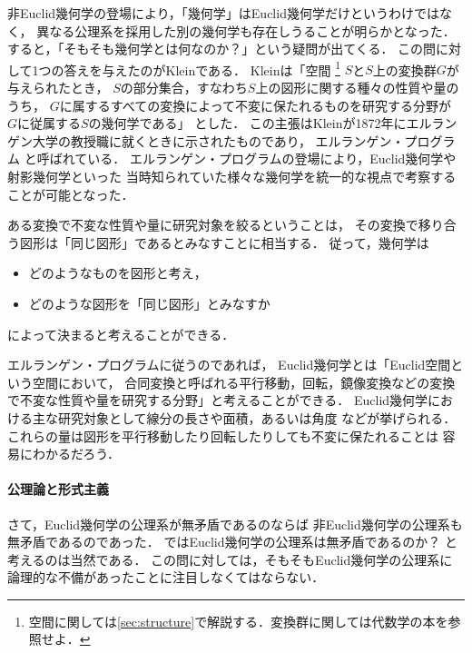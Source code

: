   非Euclid幾何学の登場により，「幾何学」はEuclid幾何学だけというわけではなく，
  異なる公理系を採用した別の幾何学も存在しうることが明らかとなった．
  すると，「そもそも幾何学とは何なのか？」という疑問が出てくる．
  この問に対して1つの答えを与えたのがKleinである．
  Kleinは「空間
  \footnote{空間に関しては\ref{sec:structure}で解説する．変換群に関しては代数学の本を参照せよ．}
  $S$と$S$上の変換群$G$が与えられたとき，
  $S$の部分集合，すなわち$S$上の図形に関する種々の性質や量のうち，
  $G$に属するすべての変換によって不変に保たれるものを研究する分野が
  $G$に従属する$S$の幾何学である」
  とした．
  この主張はKleinが1872年にエルランゲン大学の教授職に就くときに示されたものであり，
  エルランゲン・プログラム
  と呼ばれている．
  エルランゲン・プログラムの登場により，Euclid幾何学や射影幾何学といった
  当時知られていた様々な幾何学を統一的な視点で考察することが可能となった．

  ある変換で不変な性質や量に研究対象を絞るということは，
  その変換で移り合う図形は「同じ図形」であるとみなすことに相当する．
  従って，幾何学は
  \begin{itemize}
    \item どのようなものを図形と考え，
    \item どのような図形を「同じ図形」とみなすか
  \end{itemize}
  によって決まると考えることができる．

  エルランゲン・プログラムに従うのであれば，
  Euclid幾何学とは「Euclid空間という空間において，
  合同変換と呼ばれる平行移動，回転，鏡像変換などの変換
  で不変な性質や量を研究する分野」と考えることができる．
  Euclid幾何学における主な研究対象として線分の長さや面積，あるいは角度
  などが挙げられる．
  これらの量は図形を平行移動したり回転したりしても不変に保たれることは
  容易にわかるだろう．

 \paragraph{公理論と形式主義}
  さて，Euclid幾何学の公理系が無矛盾であるのならば
  非Euclid幾何学の公理系も無矛盾であるのであった．
  ではEuclid幾何学の公理系は無矛盾であるのか？ と考えるのは当然である．
  この問に対しては，そもそもEuclid幾何学の公理系に
  論理的な不備があったことに注目しなくてはならない．
  
